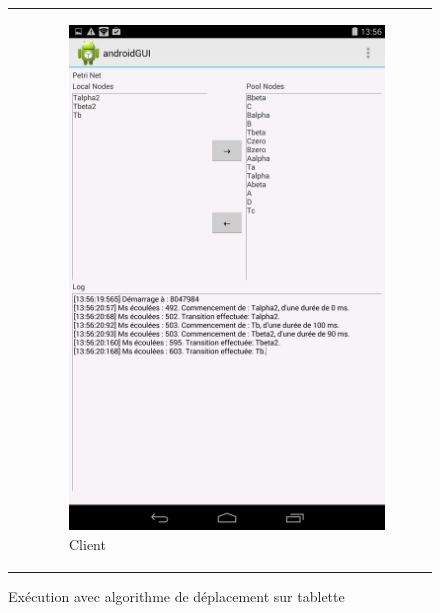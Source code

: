 \begin{figure}
\begin{tabular}{rl}
		&
		\begin{subfigure}{0.5\textwidth}
			\centering
			\includegraphics[scale=0.22]{images/resultats/client_algo_wifi.png}
			\caption{Client}
		\end{subfigure}
		\end{tabular}
		
		\caption{Exécution avec algorithme de déplacement sur tablette}
		\label{fig.androDepl}
	\end{figure}
	
	